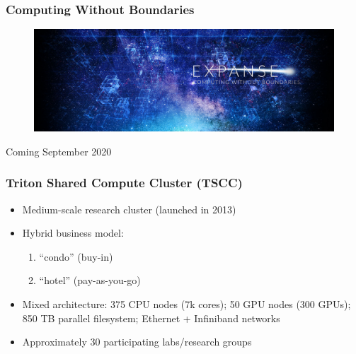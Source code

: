 \documentclass{beamer}
\begin{document}
\begin{frame}
   \frametitle{Computing Without Boundaries}
   \vspace{-1.0em}
   \begin{figure}[htbp]
      \includegraphics[width=1.0\textwidth]{images/expanse-banner.jpg}
   \end{figure}
   \begin{center}
      Coming September 2020
   \end{center}
\end{frame}

\begin{frame}
   \frametitle{Triton Shared Compute Cluster (TSCC)}
   \begin{itemize}
      \setlength\itemsep{1.0em}
      \item Medium-scale research cluster (launched in 2013)
      \item Hybrid business model:
      \begin{enumerate}
         \vspace{0.5em}
         \item ``condo'' (buy-in)
         \item ``hotel'' (pay-as-you-go)
      \end{enumerate}
      \item Mixed architecture: 375 CPU nodes (7k cores); 50 GPU nodes (300 GPUs); 850 TB parallel filesystem; Ethernet + Infiniband networks
      \item Approximately 30 participating labs/research groups
   \end{itemize}
\end{frame}
\end{document}
